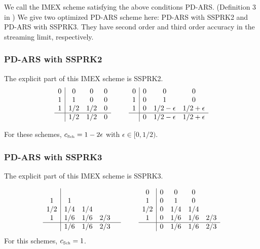 We call the IMEX scheme satisfying the above conditions {PD-ARS}. (Definition 3 in \cite{chu_etal_2018})
We give two optimized PD-ARS scheme here: PD-ARS with SSPRK2 and  PD-ARS with SSPRK3. 
They have second order and third order accuracy in the streaming limit, respectively.
\subsubsection{PD-ARS with SSPRK2}
The explicit part of this IMEX scheme is SSPRK2.
\begin{equation}
  \begin{array}{c | c c c}
  	0 & 0   & 0 & 0 \\
  	1 & 1   & 0 & 0 \\
  	1 & 1/2 & 1/2 & 0 \\ \hline
  	  & 1/2 & 1/2 & 0
  \end{array}
  \qquad
  \begin{array}{c | c c c}
  	0 & 0 & 0            & 0            \\
  	1 & 0 & 1            & 0            \\
  	1 & 0 & 1/2-\epsilon & 1/2+\epsilon \\ \hline
  	  & 0 & 1/2-\epsilon & 1/2+\epsilon
  \end{array}
\end{equation}

For these schemes, $c_{\mbox{\tiny Sch}}= 1 - 2\epsilon$ with $\epsilon \in [0, 1/2)$.

\subsubsection{PD-ARS with SSPRK3}
The explicit part of this IMEX scheme is SSPRK3.

\begin{equation}
  \begin{array}{c | c c c c}
  	    &     &     &     &  \\
  	 1  & 1   &     &     &  \\
  	1/2 & 1/4 & 1/4 &  \\
  	 1  & 1/6 & 1/6 & 2/3 &  \\ \hline
  	    & 1/6 & 1/6 & 2/3 &
  \end{array}
  \qquad
  \begin{array}{c | c c c c}
  	0 & 0 & 0            & 0            \\
  	1 & 0 & 1            & 0            \\
  	1/2 & 0 & 1/4 & 1/4 \\ 
  	1 & 0 & 1/6 & 1/6 & 2/3\\\hline
  	  & 0 & 1/6 & 1/6 & 2/3
  \end{array}
\end{equation}
For this schemes, $c_{\mbox{\tiny Sch}}= 1$.